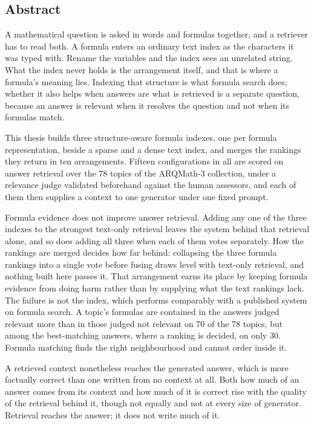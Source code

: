 \clearpage

\subsection*{Abstract}

A mathematical question is asked in words and formulas together, and a retriever has to read
both. A formula enters an ordinary text index as the characters it was typed with. Rename the
variables and the index sees an unrelated string. What the index never holds is the arrangement
itself, and that is where a formula's meaning lies. Indexing that structure is what formula
search does; whether it also helps when answers are what is retrieved is a separate question,
because an answer is relevant when it resolves the question and not when its formulas match.

This thesis builds three structure-aware formula indexes, one per formula representation, beside
a sparse and a dense text index, and merges the rankings they return in ten arrangements. Fifteen
configurations in all are scored on answer retrieval over the 78 topics of the ARQMath-3
collection, under a relevance judge validated beforehand against the human assessors, and each of
them then supplies a context to one generator under one fixed prompt.

Formula evidence does not improve answer retrieval. Adding any one of the three indexes to the
strongest text-only retrieval leaves the system behind that retrieval alone, and so does adding
all three when each of them votes separately. How the rankings are merged decides how far behind:
collapsing the three formula rankings into a single vote before fusing draws level with text-only
retrieval, and nothing built here passes it. That arrangement earns its place by keeping formula
evidence from doing harm rather than by supplying what the text rankings lack. The failure is not
the index, which performs comparably with a published system on formula search. A topic's
formulas are contained in the answers judged relevant more than in those judged not relevant on
70 of the 78 topics, but among the best-matching answers, where a ranking is decided, on only 30.
Formula matching finds the right neighbourhood and cannot order inside it.

A retrieved context nonetheless reaches the generated answer, which is more factually correct
than one written from no context at all. Both how much of an answer comes from its context and
how much of it is correct rise with the quality of the retrieval behind it, though not equally
and not at every size of generator. Retrieval reaches the answer; it does not write much of it.

